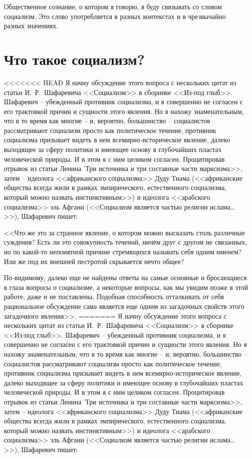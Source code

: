 \documentclass{book}
\begin{document}
Общественное сознание, о котором я говорю, я буду связывать со словом социализм.  Это слово употребляется в разных контекстах и в чрезвычайно разных значениях.

\section{Что такое социализм?}

<<<<<<< HEAD
Я начну обсуждение этого вопроса с нескольких цитат из статьи И.~Р.~Шафаревича <<Социализм>> в сборнике <<Из‑под глыб>>. Шафаревич -- убежденный противник социализма, и я совершенно не согласен с его трактовкой причин и сущности этого явления. Но я нахожу знаменательным, что в то время как многие -- и, вероятно, большинство -- социалистов рассматривают социализм просто как политическое течение, противник социализма призывает видеть в нем всемирно‑историческое явление, далеко выходящее за сферу политики и имеющее основу в глубочайших пластах человеческой природы. И в этом я с ним целиком согласен.
Процитировав отрывок из статьи Ленина 'Три источника и три составные части марксизма>>, затем -- идеолога <<африканского социализма>> Дуду Тиама (<<африканские общества всегда жили в рамках эмпирического, естественного социализма, который можно назвать инстинктивным>>) и идеолога <<арабского социализма>> эль Афгани (<<Социализм является частью религии ислама\ldots>>), Шафаревич пишет:

<<Что же это за странное явление, о котором можно высказать столь различные суждения? Есть ли это совокупность течений, ничем друг с другом не связанных, но по какой‑то непо­нятной причине стремящихся называть себя одним именем? Или же под их внешней пестротой скрывается нечто общее?

По‑видимому, далеко еще не найдены ответы на самые основные и бросающиеся в глаза вопросы о социализме, а некоторые вопросы, как мы увидим позже в этой работе, даже и не поставлены. Подобная способность отталкивать от себя рациональное обсуждение сама является еще одним из загадочных свойств этого загадочного явления>>.
=======
Я начну обсуждение этого вопроса с нескольких цитат из статьи И.~Р.~Шафаревича <<Социализм>> в сборнике <<Из-под глыб>>. Шафаревич -- убежденный противник социализма, и я совершенно не согласен с его трактовкой причин и сущности этого явления. Но я нахожу знаменательным, что в то время как многие -- и, вероятно, большинство -- социалистов рассматривают социализм просто как политическое течение, противник социализма призывает видеть в нем всемирно-историческое явление, далеко выходящее за сферу политики и имеющее основу в глубочайших пластах человеческой природы. И в этом я с ним целиком согласен.
Процитировав отрывок из статьи Ленина 'Три источника и три составные части марксизма>>, затем -- идеолога <<африканского социализма>> Дуду Тиама (<<африканские общества всегда жили в рамках эмпирического, естественного социализма, который можно назвать инстинктивным>>) и идеолога <<арабского социализма>> эль Афгани (<<Социализм является частью религии ислама\ldots>>), Шафаревич пишет:
\end{document}
